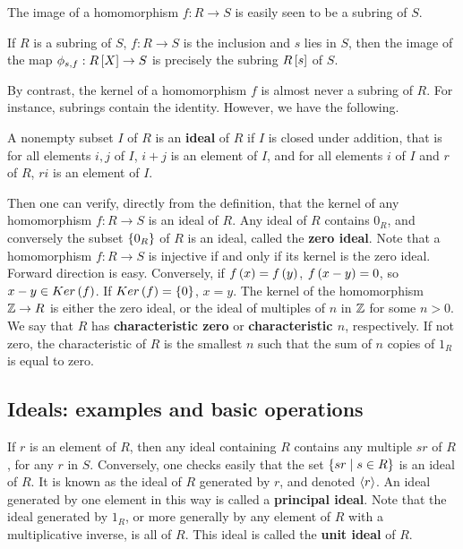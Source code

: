 The image of a homomorphism $ f : R \to S $ is easily seen to be a subring of $ S $.

\begin{example2}
If $ R $ is a subring of $ S $, $ f : R \to S $ is the inclusion and $ s $ lies in $ S $, then the image of the map $ \phi_{s, f} : R\sb{X} \to S $ is precisely the subring $ R\sb{s} $ of $ S $.
\end{example2}

By contrast, the kernel of a homomorphism $ f $ is almost never a subring of $ R $. For instance, subrings contain the identity. However, we have the following.


\begin{definition}
A nonempty subset $ I $ of $ R $ is an \textbf{ideal} of $ R $ if $ I $ is closed under addition, that is for all elements $ i, j $ of $ I $, $ i + j $ is an element of $ I $, and for all elements $ i $ of $ I $ and $ r $ of $ R $, $ ri $ is an element of $ I $.
\end{definition}

Then one can verify, directly from the definition, that the kernel of any homomorphism $ f : R \to S $ is an ideal of $ R $. Any ideal of $ R $ contains $ 0_R $, and conversely the subset $ \cb{0_R} $ of $ R $ is an ideal, called the \textbf{zero ideal}. Note that a homomorphism $ f : R \to S $ is injective if and only if its kernel is the zero ideal. Forward direction is easy. Conversely, if $ f\rb{x} = f\rb{y} $, $ f\rb{x - y} = 0 $, so $ x - y \in Ker\rb{f} $. If $ Ker\rb{f} = \cb{0} $, $ x = y $. The kernel of the homomorphism $ \Z \to R $ is either the zero ideal, or the ideal of multiples of $ n $ in $ \Z $ for some $ n > 0 $. We say that $ R $ has \textbf{characteristic zero} or \textbf{characteristic $ n $}, respectively. If not zero, the characteristic of $ R $ is the smallest $ n $ such that the sum of $ n $ copies of $ 1_R $ is equal to zero.

\subsection{Ideals: examples and basic operations}

If $ r $ is an element of $ R $, then any ideal containing $ R $ contains any multiple $ sr $ of $ R $, for any $ r $ in $ S $. Conversely, one checks easily that the set $ \cb{sr \mid s \in R} $ is an ideal of $ R $. It is known as the ideal of $ R $ generated by $ r $, and denoted $ \ab{r} $. An ideal generated by one element in this way is called a \textbf{principal ideal}. Note that the ideal generated by $ 1_R $, or more generally by any element of $ R $ with a multiplicative inverse, is all of $ R $. This ideal is called the \textbf{unit ideal} of $ R $.

